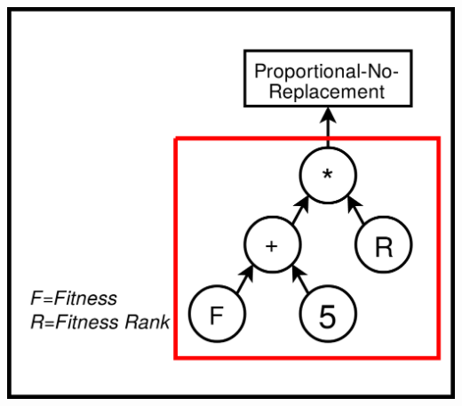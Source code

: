 \documentclass{beamer}
\begin{document}
\begin{frame}
\begin{columns}
\begin{column}{0.5\textwidth}
			\includegraphics[width=\textwidth]{example_eppsea_no_forks_red_highlight}		
		\end{column}
		\end{columns}		

	\end{frame}	
	
\end{document}
